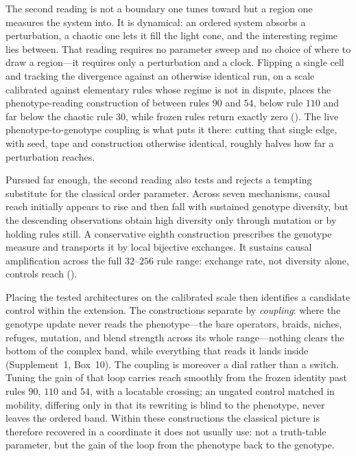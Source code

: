 \documentclass[man,12pt,floatsintext,donotrepeattitle]{apa7}
\newcommand{\secref}[1]{\emph{\nameref{#1}}}
\newcommand{\suppfindingref}[1]{Supplement~1, Box~#1}
\begin{document}
The second reading is not a boundary one tunes toward but a region one measures
the system into. It is dynamical: an
ordered system absorbs a perturbation, a chaotic one lets it fill the light
cone, and the interesting regime lies between. That reading requires no
parameter sweep and no choice of where to draw a region---it requires only a
perturbation and a clock. Flipping a single cell and tracking the divergence
against an otherwise identical run, on a scale calibrated against elementary
rules whose regime is not in dispute, places the phenotype-reading construction
of \secref{sec:braiding} between rules $90$ and $54$, below rule $110$ and far
below the chaotic rule $30$, while frozen rules return exactly zero
(\secref{sec:causal}). The live phenotype-to-genotype coupling is what puts it
there: cutting that single edge, with seed, tape and construction otherwise
identical, roughly halves how far a perturbation reaches.

Pursued far enough, the second reading also tests and rejects a tempting
substitute for the classical order parameter. Across seven mechanisms, causal
reach initially appears to rise and then fall with sustained genotype
diversity, but the descending observations obtain high diversity only through
mutation or by holding rules still. A conservative eighth construction
prescribes the genotype measure and transports it by local bijective exchanges.
It sustains causal amplification across the full $32$--$256$ rule range:
exchange rate, not diversity alone, controls reach
(\secref{sec:diversity-axis}).

Placing the tested architectures on the calibrated scale then identifies a
candidate control within the extension. The
constructions separate by \emph{coupling}: where the genotype update never reads
the phenotype---the bare operators, braids, niches, refuges, mutation, and blend
strength across its whole range---nothing clears the bottom of the complex band,
while everything that reads it lands inside (\suppfindingref{10}). The coupling
is moreover a dial rather than a switch. Tuning the gain of that loop carries reach smoothly from the frozen
identity past rules $90$, $110$ and $54$, with a locatable crossing; an ungated
control matched in mobility, differing only in that its rewriting is blind to
the phenotype, never leaves the ordered band. Within these constructions the
classical picture is therefore recovered in a coordinate it does not usually
use: not a truth-table parameter, but the gain of the loop from the phenotype
back to the genotype.
\end{document}
